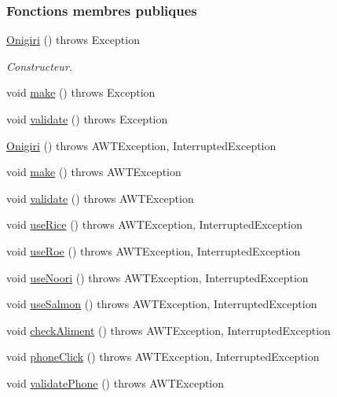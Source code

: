 \subsubsection*{Fonctions membres publiques}
\begin{DoxyCompactItemize}
\item 
\hyperlink{classSuchi_1_1Onigiri_a3f61f1822390fd76c39887e7f464f25b}{Onigiri} ()  throws Exception
\begin{DoxyCompactList}\small\item\em Constructeur. \end{DoxyCompactList}\item 
void \hyperlink{classSuchi_1_1Onigiri_a9be975ee57ccc08101af53611d4a3f88}{make} ()  throws Exception
\item 
void \hyperlink{classSuchi_1_1Onigiri_a82c4794ab8fd1c06a1fc8d2db572c042}{validate} ()  throws Exception
\item 
\hyperlink{classSuchi_1_1Onigiri_a3f61f1822390fd76c39887e7f464f25b}{Onigiri} ()  throws A\+W\+T\+Exception, Interrupted\+Exception
\item 
void \hyperlink{classSuchi_1_1Onigiri_a9be975ee57ccc08101af53611d4a3f88}{make} ()  throws A\+W\+T\+Exception
\item 
void \hyperlink{classSuchi_1_1Onigiri_a82c4794ab8fd1c06a1fc8d2db572c042}{validate} ()  throws A\+W\+T\+Exception 
\item 
void \hyperlink{classSuchi_1_1Recette_aa5204bd305d5029631ff4b8be9def83e}{use\+Rice} ()  throws A\+W\+T\+Exception, Interrupted\+Exception
\item 
void \hyperlink{classSuchi_1_1Recette_a500a2584148f1f08a1c7cdf7424e9a9c}{use\+Roe} ()  throws A\+W\+T\+Exception, Interrupted\+Exception
\item 
void \hyperlink{classSuchi_1_1Recette_a17d14fe05c28a44768d91e577e9bc511}{use\+Noori} ()  throws A\+W\+T\+Exception, Interrupted\+Exception
\item 
void \hyperlink{classSuchi_1_1Recette_a0fc2aa67439d0822762548c49cb29dec}{use\+Salmon} ()  throws A\+W\+T\+Exception, Interrupted\+Exception
\item 
void \hyperlink{classSuchi_1_1Recette_adc00873c980219a9a3fa7eddeaea3253}{check\+Aliment} ()  throws A\+W\+T\+Exception, Interrupted\+Exception
\item 
void \hyperlink{classSuchi_1_1Recette_a3e4c1e285cd28d0f2f2d364ea637c165}{phone\+Click} ()  throws A\+W\+T\+Exception, Interrupted\+Exception
\item 
void \hyperlink{classSuchi_1_1Recette_aae633102735c0f0a23f0aa84a0366fb3}{validate\+Phone} ()  throws A\+W\+T\+Exception

\end{DoxyCompactItemize}
